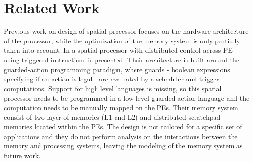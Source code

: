 \section{Related Work}






Previous work on design of spatial processor focuses on the hardware architecture of the processor, while the optimization of the memory system is only partially taken into account.
In \cite{parashar2014efficient} a spatial processor with distributed control across PE using triggered instructions is presented. Their architecture is built around the guarded-action programming paradigm, where guards - boolean expressions specifying if an action is legal - are evaluated by a scheduler and trigger computations. Support for high level languages is missing, so this spatial processor needs to be programmed in a low level guarded-action language and the computation needs to be manually mapped on the PEs. Their memory system consist of two layer of memories (L1 and L2) and distributed scratchpad memories located within the PEs. The design is not tailored for a specific set of applications and they do not perform analysis on the interactions between the memory and processing systems, leaving the modeling of the memory system as future work.

